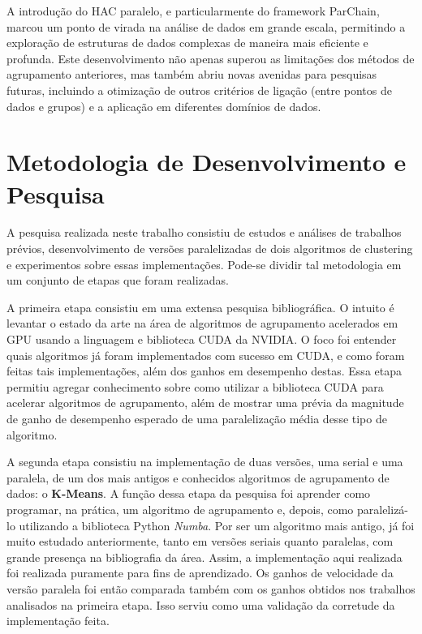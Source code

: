 \documentclass[12pt, %
openright, 
oneside, %
a4paper,    %
brazil]{facom-ufu-abntex2}
\def\qntAlgrtm{dois}
\begin{document}
A introdução do HAC paralelo, e particularmente do framework ParChain, marcou um ponto de virada na análise de dados em grande escala, permitindo a exploração de estruturas de dados complexas de maneira mais eficiente e profunda. Este desenvolvimento não apenas superou as limitações dos métodos de agrupamento anteriores, mas também abriu novas avenidas para pesquisas futuras, incluindo a otimização de outros critérios de ligação (entre pontos de dados e grupos) e a aplicação em diferentes domínios de dados.





\chapter{Metodologia de Desenvolvimento e Pesquisa}


A pesquisa realizada neste trabalho consistiu de estudos e análises de trabalhos prévios, desenvolvimento de versões paralelizadas de \qntAlgrtm{} algoritmos de clustering e experimentos sobre essas implementações. Pode-se dividir tal metodologia em um conjunto de etapas que foram realizadas.

A primeira etapa consistiu em uma extensa pesquisa bibliográfica. O intuito é levantar o estado da arte na área de algoritmos de agrupamento acelerados em GPU usando a linguagem e biblioteca CUDA da NVIDIA. O foco foi entender quais algoritmos já foram implementados com sucesso em CUDA, e como foram feitas tais implementações, além dos ganhos em desempenho destas. Essa etapa permitiu agregar conhecimento sobre como utilizar a biblioteca CUDA para acelerar algoritmos de agrupamento, além de mostrar uma prévia da magnitude de ganho de desempenho esperado de uma paralelização média desse tipo de algoritmo.

A segunda etapa consistiu na implementação de duas versões, uma serial e uma paralela, de um dos mais antigos e conhecidos algoritmos de agrupamento de dados: o \textbf{K-Means}. A função dessa etapa da pesquisa foi aprender como programar, na prática, um algoritmo de agrupamento e, depois, como paralelizá-lo utilizando a biblioteca Python \textit{Numba}. Por ser um algoritmo mais antigo, já foi muito estudado anteriormente, tanto em versões seriais quanto paralelas, com grande presença na bibliografia da área. Assim, a implementação aqui realizada foi realizada puramente para fins de aprendizado. Os ganhos de velocidade da versão paralela foi então comparada também com os ganhos obtidos nos trabalhos analisados na primeira etapa. Isso serviu como uma validação da corretude da implementação feita.
\end{document}
